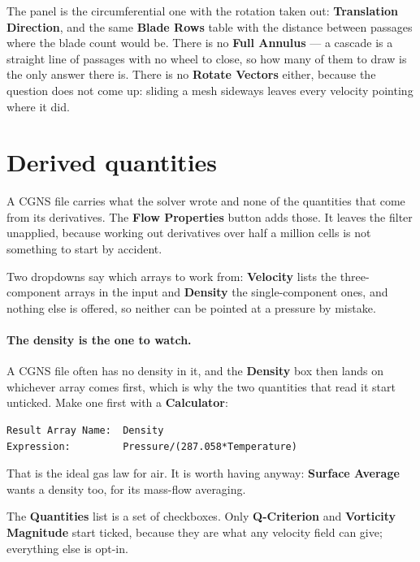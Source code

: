 \documentclass[11pt,a4paper]{article}
\newcommand{\prop}[1]{\textbf{#1}}          %
\newcommand{\menu}[1]{\textbf{#1}}          %
\begin{document}
The panel is the circumferential one with the rotation taken out:
\prop{Translation Direction}, and the same \prop{Blade Rows} table with the
distance between passages where the blade count would be. There is no
\prop{Full Annulus} --- a cascade is a straight line of passages with no wheel to
close, so how many of them to draw is the only answer there is. There is no
\prop{Rotate Vectors} either, because the question does not come up: sliding a
mesh sideways leaves every velocity pointing where it did.

\section{Derived quantities}

A CGNS file carries what the solver wrote and none of the quantities that come
from its derivatives. The \menu{Flow Properties} button adds those. It leaves the
filter unapplied, because working out derivatives over half a million cells is
not something to start by accident.

Two dropdowns say which arrays to work from: \prop{Velocity} lists the
three-component arrays in the input and \prop{Density} the single-component
ones, and nothing else is offered, so neither can be pointed at a pressure by
mistake.

\paragraph{The density is the one to watch.} A CGNS file often has no density in
it, and the \prop{Density} box then lands on whichever array comes first, which
is why the two quantities that read it start unticked. Make one first with a
\menu{Calculator}:

\begin{lstlisting}[style=plain]
Result Array Name:  Density
Expression:         Pressure/(287.058*Temperature)
\end{lstlisting}

That is the ideal gas law for air. It is worth having anyway: \menu{Surface
Average} wants a density too, for its mass-flow averaging.

The \prop{Quantities} list is a set of checkboxes. Only \prop{Q-Criterion} and
\prop{Vorticity Magnitude} start ticked, because they are what any velocity field
can give; everything else is opt-in.
\end{document}
